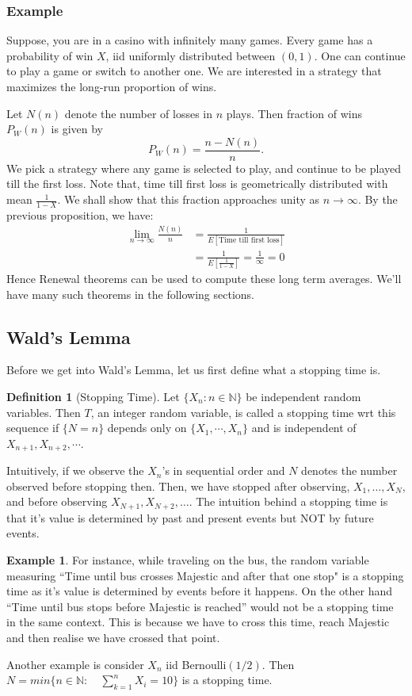 \documentclass[a4paper,10pt]{article}
\theoremstyle{plain}
\theoremstyle{definition}
\newtheorem{defn}[thm]{Definition}
\newtheorem{exmp}[thm]{Example}
\begin{document}
\subsubsection{Example}
Suppose, you are in a casino with infinitely many games. Every game has a probability of win $X$, iid uniformly distributed between $(0,1)$. One can continue to play a game or switch to another one. We are interested in a strategy that maximizes the long-run proportion of wins.

Let $N(n)$ denote the number of losses in $n$ plays. Then fraction of wins $P_W(n)$ is given by 
\begin{equation*}
P_W(n) = \frac{n-N(n)}{n}.
\end{equation*}
We pick a strategy where any game is selected to play, and continue to be played till the first loss. Note that, time till first loss is geometrically distributed with mean $\frac{1}{1-X}$. We shall show that this fraction approaches unity as $n \to \infty$. By the previous proposition, we have:
\begin{align*}
\lim_{n \to \infty} \frac{N(n)}{n} &= \frac{1}{E[\mbox{Time till first loss}]} \\
&= \frac{1}{E\left[\frac{1}{1-X}\right]} = \frac{1}{\infty} = 0
\end{align*}
Hence Renewal theorems can be used to compute these long term averages. We'll have many such theorems in the following sections.

\subsection{Wald's Lemma}
Before we get into Wald's Lemma, let us first define what a stopping time is.
\begin{defn}[Stopping Time]
Let $\{X_n: n\in \mathbb{N}\}$ be independent random variables. Then $T$, an integer random variable, is called a stopping time wrt this sequence if $\{N=n\}$ depends only on $\{X_1,\cdots,X_n\}$ and is independent of $X_{n+1}, X_{n+2},\cdots$. 
\end{defn}
Intuitively, if we observe the $X_n$'s in sequential order and $N$ denotes the number observed before stopping then. Then, we have stopped after observing, $X_1, \ldots, X_N$, and before observing $X_{N+1}, X_{N+2}, \ldots$. 
The intuition behind a stopping time is that it's value is determined by past and present events but NOT by future events. 
\begin{exmp}
For instance, while traveling on the bus, the random variable measuring ``Time until bus crosses Majestic and after that one stop" is a stopping time as it's value is determined by events before it happens. On the other hand ``Time until bus stops before Majestic is reached'' would not be a stopping time  in the same context. This is because we have to cross this time, reach Majestic and then realise we have crossed that point. 
\end{exmp}
Another example is consider $X_n$ iid Bernoulli$(1/2)$. Then $N = min \{n \in \mathbb{N}:\quad \sum_{k=1}^n X_i = 10\}$ is a stopping time.
\end{document}
